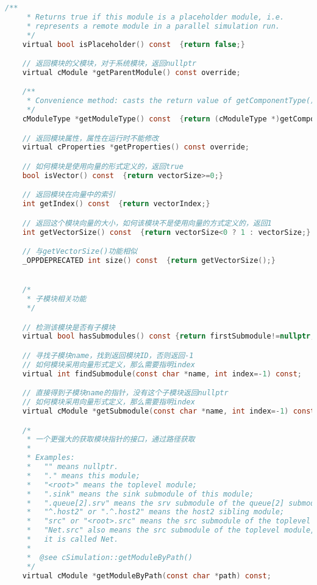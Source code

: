 \begin{lstlisting}[language=c,caption=My]
    /**
     * Returns true if this module is a placeholder module, i.e.
     * represents a remote module in a parallel simulation run.
     */
    virtual bool isPlaceholder() const  {return false;}

    // 返回模块的父模块，对于系统模块，返回nullptr
    virtual cModule *getParentModule() const override;

    /**
     * Convenience method: casts the return value of getComponentType() to cModuleType.
     */
    cModuleType *getModuleType() const  {return (cModuleType *)getComponentType();}

    // 返回模块属性，属性在运行时不能修改
    virtual cProperties *getProperties() const override;

    // 如何模块是使用向量的形式定义的，返回true
    bool isVector() const  {return vectorSize>=0;}

    // 返回模块在向量中的索引
    int getIndex() const  {return vectorIndex;}

    // 返回这个模块向量的大小，如何该模块不是使用向量的方式定义的，返回1
    int getVectorSize() const  {return vectorSize<0 ? 1 : vectorSize;}

    // 与getVectorSize()功能相似
    _OPPDEPRECATED int size() const  {return getVectorSize();}


    /*
     * 子模块相关功能
     */

    // 检测该模块是否有子模块
    virtual bool hasSubmodules() const {return firstSubmodule!=nullptr;}

    // 寻找子模块name，找到返回模块ID，否则返回-1
    // 如何模块采用向量形式定义，那么需要指明index
    virtual int findSubmodule(const char *name, int index=-1) const;

    // 直接得到子模块name的指针，没有这个子模块返回nullptr
    // 如何模块采用向量形式定义，那么需要指明index
    virtual cModule *getSubmodule(const char *name, int index=-1) const;

    /*
     * 一个更强大的获取模块指针的接口，通过路径获取
     *
     * Examples:
     *   "" means nullptr.
     *   "." means this module;
     *   "<root>" means the toplevel module;
     *   ".sink" means the sink submodule of this module;
     *   ".queue[2].srv" means the srv submodule of the queue[2] submodule;
     *   "^.host2" or ".^.host2" means the host2 sibling module;
     *   "src" or "<root>.src" means the src submodule of the toplevel module;
     *   "Net.src" also means the src submodule of the toplevel module, provided
     *   it is called Net.
     *
     *  @see cSimulation::getModuleByPath()
     */
    virtual cModule *getModuleByPath(const char *path) const;


\end{lstlisting}
